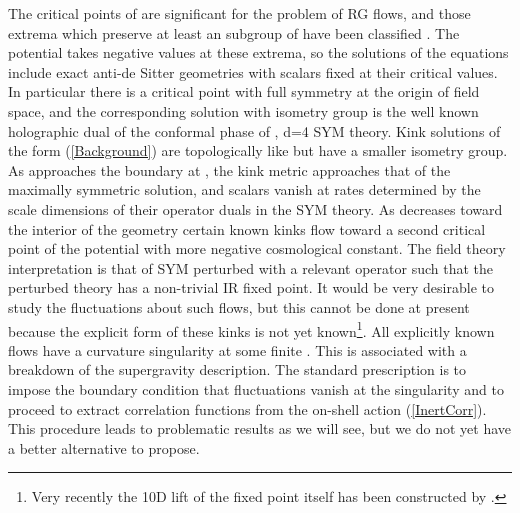 \documentclass[a4paper,12pt]{article}
\begin{document}
The critical points of \coordHE{} are significant for the problem of
 RG  flows, and  those  extrema  which preserve  at  least an  \coordHE{}
 subgroup of  \coordHE{} have  been classified \cite{kpw}.  The potential
 takes  negative values  at these  extrema,  so the  solutions of  the
 equations include exact anti-de  Sitter geometries with scalars fixed
 at their  critical values.  In particular there  is a  critical point
 with  full \coordHE{} symmetry  at the  origin of  field space,  and the
 corresponding \coordHE{}  solution with \coordHE{} isometry  group is the
 well known holographic  dual of the conformal phase  of \coordHE{},
 d=4  SYM theory. Kink  solutions of  the form  (\ref{Background}) are
 topologically like \coordHE{} but have  a smaller isometry group. As \coordHE{}
 approaches the  boundary at \coordHE{}, the kink  metric approaches
 that of the maximally  symmetric \coordHE{} solution, and scalars vanish
 at rates determined  by the scale dimensions of  their operator duals
 in  the SYM  theory.  As \coordHE{}  decreases  toward the  interior of  the
 geometry  certain  known  kinks  \cite{fgpw1} flow  toward  a  second
 critical  point  of the  potential  with  more negative  cosmological
 constant. The field theory interpretation is that of \coordHE{} SYM
 perturbed with a relevant operator such that the perturbed theory has
 a non-trivial IR fixed point. It would be very desirable to study the
 fluctuations about  such flows,  but this cannot  be done  at present
 because   the   explicit   form   of   these   kinks   is   not   yet
 known\footnote{Very recently  the 10D lift of the  fixed point itself
 has  been constructed by  \cite{pilchwarner}.}. All  explicitly known
 flows have  a curvature singularity  at some finite \coordHE{}.  This is
 associated  with a  breakdown of  the supergravity  description.  The
 standard  prescription  is  to  impose the  boundary  condition  that
 fluctuations  vanish at  the singularity  and to  proceed  to extract
 correlation      functions     from      the      on-shell     action
 (\ref{InertCorr}). This procedure leads  to problematic results as we
 will see, but we do not yet have a better alternative to propose.
\end{document}
